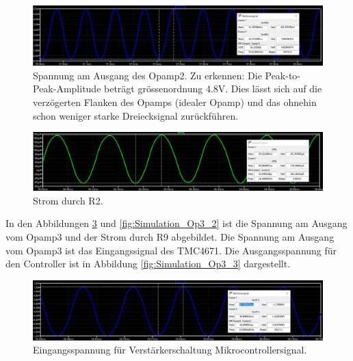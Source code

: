 \begin{figure}[h!]
	\centering
	\includegraphics[width=\textwidth]{graphics/Spannung_Ua_3.png}
	\caption{Spannung am Ausgang des Opamp2. Zu erkennen: Die Peak-to-Peak-Amplitude beträgt grössenordnung 4.8V. Dies lässt sich auf die verzögerten Flanken des Opamps (idealer Opamp) und das ohnehin schon weniger starke Dreiecksignal zurückführen.}
	\label{fig:Simulation_Sinus_Spannung}
\end{figure}
\begin{figure}[h!]
	\centering
	\includegraphics[width=\textwidth]{graphics/Strom_Ir_3.png}
	\caption{Strom durch R2.}
	\label{fig:Simulation_Sinus_Strom}
\end{figure}


In den Abbildungen \ref{fig:Simulation_Op3_1} und \ref{fig:Simulation_Op3_2} ist die Spannung am Ausgang vom Opamp3 und der Strom durch R9 abgebildet. Die Spannung am Ausgang vom Opamp3 ist das Eingangssignal des TMC4671. Die Ausgangsspannung für den Controller ist in Abbildung \ref{fig:Simulation_Op3_3} dargestellt.

\begin{figure}[h!]
	\centering
	\includegraphics[width=\textwidth]{graphics/Spannung_Ue_2.png}
	\caption{Eingangsspannung für Verstärkerschaltung Mikrocontrollersignal.}
	\label{fig:Simulation_Op3_1}
\end{figure}

